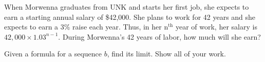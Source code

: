 \documentclass[12pt,fleqn]{exam}
\begin{document}
\begin{questions} 
    
   \question[2] When Morwenna graduates from UNK and starts her first job, she expects to earn a 
   starting annual salary of \$42,000. She plans to work for 42 years
   and she expects to earn a 3\% raise each year. Thus, in her 
   $\mathrm{n}^{\mathrm{th}}$  year 
   of work, her salary is $42,000 \times 1.03^{n-1}$. During 
   Morwenna's 42 years of labor, how much will she earn?

   \begin{solution}[2.5in]
   
    
   \end{solution}

   \question Given a formula for a sequence $b$, find its limit.
   Show all of your work.

 
   \newpage


\end{questions}
\end{document}
